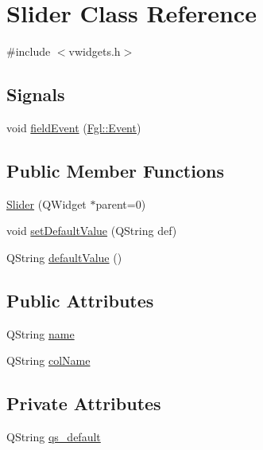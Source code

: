 \hypertarget{classSlider}{
\section{Slider Class Reference}
\label{classSlider}
}


{\ttfamily \#include $<$vwidgets.h$>$}

\subsection*{Signals}
\begin{DoxyCompactItemize}
\item 
void \hyperlink{classSlider_aaf986943e61876997b9cf675e7ad74a8}{fieldEvent} (\hyperlink{structFgl_1_1Event}{Fgl::Event})
\end{DoxyCompactItemize}
\subsection*{Public Member Functions}
\begin{DoxyCompactItemize}
\item 
\hyperlink{classSlider_acd7026578e9ac01e146b8d2e95556d87}{Slider} (QWidget $\ast$parent=0)
\item 
void \hyperlink{classSlider_a8b327f81bcf44d0a375bd8d39ce16304}{setDefaultValue} (QString def)
\item 
QString \hyperlink{classSlider_afa7ddd6b8fc0caf48ddc0c8f530cb224}{defaultValue} ()
\end{DoxyCompactItemize}
\subsection*{Public Attributes}
\begin{DoxyCompactItemize}
\item 
QString \hyperlink{classSlider_a0c9144705adc4563388fd0bf9f9cfd07}{name}
\item 
QString \hyperlink{classSlider_a7b10afcb9c8bc9d14e1cb46dcef35eb8}{colName}
\end{DoxyCompactItemize}
\subsection*{Private Attributes}
\begin{DoxyCompactItemize}
\item 
QString \hyperlink{classSlider_ab29b1fabdaa288fa1060bf1f0aa11d5a}{qs\_\-default}
\end{DoxyCompactItemize}


